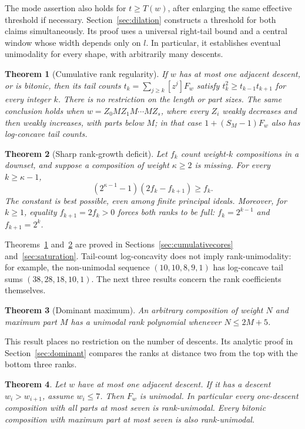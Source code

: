\documentclass[11pt]{article}
\newtheorem{theorem}{Theorem}[section]
\theoremstyle{remark}\newtheorem{remark}[theorem]{Remark}
\begin{document}
The mode assertion also holds for $t\ge T(w)$, after enlarging the
same effective threshold if necessary. Section~\ref{sec:dilation}
constructs a threshold for both claims simultaneously. Its proof uses
a universal right-tail bound and a central window whose width depends
only on $l$. In particular, it establishes eventual unimodality for
every shape, with arbitrarily many descents.

\begin{theorem}[Cumulative rank regularity]\label{thm:cumulativemain}
If $w$ has at most one adjacent descent, or is bitonic, then its tail counts
$t_k=\sum_{j\ge k}[z^j]F_w$ satisfy $t_k^2\ge t_{k-1}t_{k+1}$ for
every integer $k$. There is no restriction on the length or part sizes.
The same conclusion holds when $w=Z_0MZ_1M\cdots MZ_s$, where every
$Z_i$ weakly decreases and then weakly increases, with parts below $M$; in that
case $1+(S_M-1)F_w$ also has log-concave tail counts.
\end{theorem}

\begin{theorem}[Sharp rank-growth deficit]\label{thm:deficitmain}
Let $f_k$ count weight-$k$ compositions in a downset, and suppose a
composition of weight $\kappa\ge2$ is missing. For every $k\ge\kappa-1$,
\[
 (2^{\kappa-1}-1)(2f_k-f_{k+1})\ge f_k.
\]
The constant is best possible, even among finite principal ideals.
Moreover, for $k\ge1$, equality $f_{k+1}=2f_k>0$ forces both ranks
to be full: $f_k=2^{k-1}$ and $f_{k+1}=2^k$.
\end{theorem}

Theorems~\ref{thm:cumulativemain} and~\ref{thm:deficitmain} are proved in
Sections~\ref{sec:cumulativecores} and~\ref{sec:saturation}. Tail-count
log-concavity does not imply rank-unimodality: for example, the
non-unimodal sequence $(10,10,8,9,1)$ has log-concave tail sums
$(38,28,18,10,1)$. The next three results concern the rank coefficients themselves.

\begin{theorem}[Dominant maximum]\label{thm:dominantmain}
An arbitrary composition of weight $N$ and maximum part $M$ has a
unimodal rank polynomial whenever $N\le2M+5$.
\end{theorem}

This result places no restriction on the number of descents. Its
analytic proof in Section~\ref{sec:dominant} compares the ranks at
distance two from the top with the bottom three ranks.

\begin{theorem}\label{thm:main}
Let $w$ have at most one adjacent descent. If it has a descent $w_i>w_{i+1}$, assume $w_i\le7$. Then $F_w$ is unimodal. In particular every one-descent composition with all parts at most seven is rank-unimodal. Every bitonic composition with maximum part at most seven is also rank-unimodal.
\end{theorem}
\end{document}
